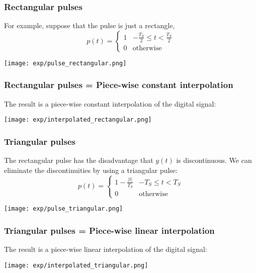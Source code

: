 \documentclass{beamer}
\begin{document}
\begin{frame}
  \frametitle{Rectangular pulses}

  For example, suppose that the pulse is  just a  rectangle,
  \begin{displaymath}
    p(t) = \begin{cases}
      1 & -\frac{T_S}{2}\le t<\frac{T_S}{2}\\
      0 & \mbox{otherwise}
    \end{cases}
  \end{displaymath}

  \centerline{\texttt{[image: exp/pulse\_rectangular.png]}}  
\end{frame}

\begin{frame}
  \frametitle{Rectangular pulses = Piece-wise constant interpolation}

  The result is a  piece-wise constant interpolation of the digital signal:

  \centerline{\texttt{[image: exp/interpolated\_rectangular.png]}}  
\end{frame}

\begin{frame}
  \frametitle{Triangular pulses}

  The rectangular pulse has the disadvantage that $y(t)$ is discontinuous.
  We can eliminate the discontinuities by using a triangular pulse:
  \begin{displaymath}
    p(t) = \begin{cases}
      1-\frac{|t|}{T_S} & -T_S\le t<T_S\\
      0 & \mbox{otherwise}
    \end{cases}
  \end{displaymath}

  \centerline{\texttt{[image: exp/pulse\_triangular.png]}}  
\end{frame}

\begin{frame}
  \frametitle{Triangular pulses = Piece-wise linear interpolation}

  The result is a  piece-wise linear interpolation of the digital signal:

  \centerline{\texttt{[image: exp/interpolated\_triangular.png]}}  
\end{frame}
\end{document}
